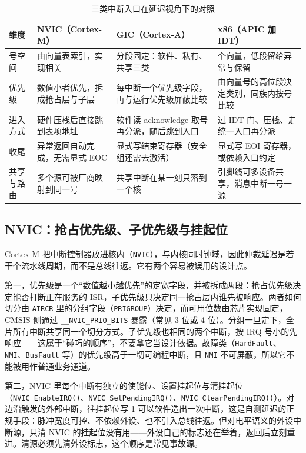 \documentclass[12pt,a4paper,fontset=fandol]{ctexbook}
\newcommand{\Fn}[1]{\texttt{#1()}}
\newcommand{\Tp}[1]{\texttt{#1}}
\newcommand{\Bk}{\discretionary{}{}{}}
\begin{document}
\begin{table}[htbp]
\centering
\caption{三类中断入口在延迟视角下的对照}\label{tab:ch03-controllers}
\begin{tabular}{>{\raggedright\arraybackslash}p{} >{\raggedright\arraybackslash}p{} >{\raggedright\arraybackslash}p{} >{\raggedright\arraybackslash}p{}}
\toprule
维度 & NVIC（Cortex-M） & GIC（Cortex-A） & x86（APIC 加 IDT） \\
\midrule
号空间 & 由向量表索引，实现相关 & 分段固定：软件、私有、共享三类 & 256 个向量，低段留给异常与保留 \\
\addlinespace
优先级 & 数值小者优先，拆成抢占层与子层 & 每中断一个优先级字段，再与运行优先级屏蔽比较 & 由向量号的高位段决定类别，同族内按号比较 \\
\addlinespace
进入方式 & 硬件压栈后直接跳到表项地址 & 软件读 acknowledge 取号再分派，随后跳到入口 & 过 IDT 门、压栈、走统一入口再分派 \\
\addlinespace
收尾 & 异常返回自动完成，无需显式 EOC & 显式写结束寄存器（安全组还需去激活） & 显式写 EOI 寄存器，或依赖入口约定 \\
\addlinespace
共享与路由 & 多个源可被厂商映射到同一号 & 共享中断在某一刻只落到一个核 & 引脚线可多设备共享，消息中断一号一源 \\
\bottomrule
\end{tabular}
\end{table}

\subsection{NVIC：抢占优先级、子优先级与挂起位}

Cortex-M 把中断控制器放进核内（\Tp{NVIC}），与内核同时钟域，因此仲裁延迟是若干个流水线周期，而不是总线往返。它有两个容易被误用的设计点。

第一，优先级是一个``数值越小越优先''的定宽字段，并被拆成两段：抢占优先级决定能否打断正在服务的 ISR，子优先级只决定同一抢占层内谁先被响应。两者如何切分由 \Tp{AIRCR} 里的分组字段（\Tp{PRIGROUP}）决定，而可用位数由芯片实现固定，CMSIS 侧通过 \Tp{\_\_NVIC\_PRIO\_BITS} 暴露（常见 3 位或 4 位）。分组一旦定下，全片所有中断共享同一个切分方式。子优先级也相同的两个中断，按 IRQ 号小的先响应——这属于``碰巧的顺序''，不要拿它当设计依据。故障类（\Tp{HardFault}、\Tp{NMI}、\Tp{BusFault} 等）的优先级高于一切可编程中断，且 \Tp{NMI} 不可屏蔽，所以它不能被用作普通业务通道。

第二，NVIC 里每个中断有独立的使能位、设置挂起位与清挂起位（\Fn{NVIC\_{\Bk}Enable{\Bk}IRQ}、\Fn{NVIC\_{\Bk}Set{\Bk}Pending{\Bk}IRQ}、\Fn{NVIC\_{\Bk}Clear{\Bk}Pending{\Bk}IRQ}）。对边沿触发的外部中断，往挂起位写 1 可以软件造出一次中断，这是自测延迟的正规手段：脉冲宽度可控、不依赖外设、也不引入总线往返。但对电平语义的外设中断源，只清 NVIC 的挂起位没有用——外设自己的标志还在举着，返回后立刻重进。清源必须先清外设标志，这个顺序是常见事故源。
\end{document}

